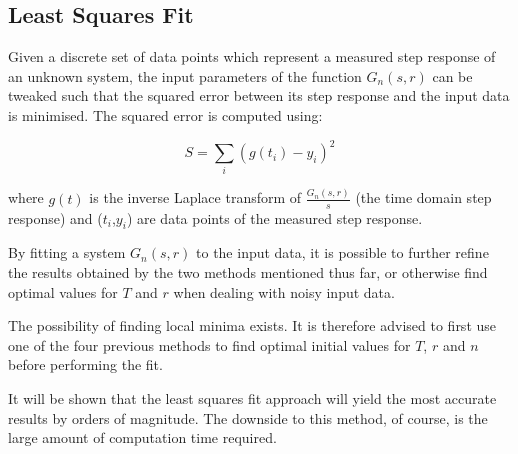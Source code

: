 \subsection{Least Squares Fit}

Given a discrete set of data points which represent a measured step  response of
an  unknown system, the input parameters  of  the  function  $G_n(s,r)$  can  be
tweaked such that the squared error between its step response and the input data
is minimised. The squared error is computed using:

\begin{equation}
    S = \sum_{i} \left(g(t_i)-y_i\right)^2
\end{equation}

where $g(t)$ is the inverse Laplace transform  of $\frac{G_n(s,r)}{s}$ (the time
domain step response) and ($t_i$,$y_i$) are  data  points  of  the measured step
response.

By fitting a system $G_n(s,r)$ to  the  input  data,  it  is possible to further
refine the results  obtained by the two methods mentioned thus far, or otherwise
find  optimal  values  for  $T$  and  $r$ when dealing with  noisy  input  data.

The possibility of finding local minima exists. It is therefore advised to first
use one of the four previous methods to find optimal initial values for $T$, $r$
and $n$ before performing the fit.

It will be shown that the  least  squares  fit  approach  will  yield  the  most
accurate results by orders of magnitude. The downside to this method, of course,
is the large amount of computation time required.

